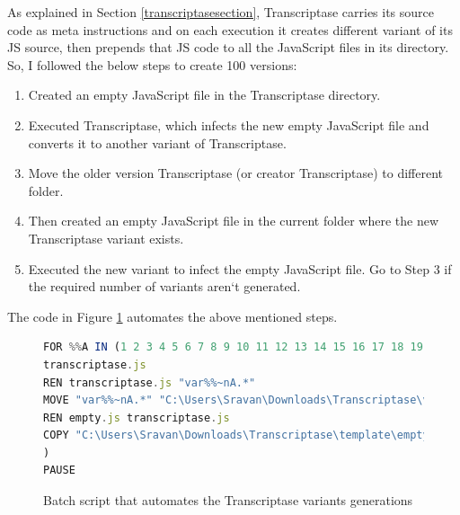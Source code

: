 As explained in Section \ref{transcriptasesection}, Transcriptase carries its source code as meta instructions and on each execution it creates different variant of its JS source, then prepends that JS code to all the JavaScript files in its directory. So, I followed the below steps to create 100 versions:
\begin{enumerate}
\item Created an empty JavaScript file in the Transcriptase directory.
\item Executed Transcriptase, which infects the new empty JavaScript file and converts it to another variant of Transcriptase.
\item Move the older version Transcriptase (or creator Transcriptase) to different folder.
\item Then created an empty JavaScript file in the current folder where the new Transcriptase variant exists.
\item Executed the new variant to infect the empty JavaScript file. Go to Step 3 if the required number of variants aren`t generated. 
\end{enumerate}
The code in Figure \ref{fig:batchscriptcode} automates the above mentioned steps.

\begin{figure}[h]
  \centering
\begin{lstlisting}[frame=single,language=JavaScript,mathescape=false,morekeywords={REN, MOVE, IN, COPY, PAUSE, FOR, DO}]
FOR %%A IN (1 2 3 4 5 6 7 8 9 10 11 12 13 14 15 16 17 18 19 20 21 22 23 24 25 26 27 28 29 30 31 32 33 34 35 36 37 38 39 40 41 42 43 44 45 46 47 48 49 50 51 52 53 54 55 56 57 58 59 60 61 62 63 64 65 66 67 68 69 70 71 72 73 74 75 76 77 78 79 80 81 82 83 84 85 86 87 88 89 90 91 92 93 94 95 96 97 98 99 100) DO (
transcriptase.js
REN transcriptase.js "var%%~nA.*"
MOVE "var%%~nA.*" "C:\Users\Sravan\Downloads\Transcriptase\versions"
REN empty.js transcriptase.js
COPY "C:\Users\Sravan\Downloads\Transcriptase\template\empty.js" .
)
PAUSE
\end{lstlisting}
\caption[Batch script]{Batch script that automates the Transcriptase variants generations}
    \label{fig:batchscriptcode}
\end{figure}

